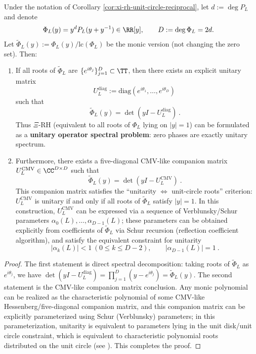 \begin{proposition}\label{prop:xi-hilbert-polya-cmv}
Under the notation of Corollary \ref{cor:xi-rh-unit-circle-reciprocal}, let \(d:=\deg P_L\) and denote
\[
\Phi_L(y)=y^dP_L(y+y^{-1})\in\RR[y],
\qquad
D:=\deg \Phi_L=2d.
\]
Let \(\widetilde\Phi_L(y):=\Phi_L(y)/\mathrm{lc}(\Phi_L)\) be the monic version (not changing the zero set).
Then:
\begin{enumerate}
  \item If all roots of \(\widetilde\Phi_L\) are \(\{e^{i\theta_j}\}_{j=1}^{D}\subset\TT\), then there exists an explicit unitary matrix
  \[
  U_L^{\mathrm{diag}}:=\mathrm{diag}(e^{i\theta_1},\dots,e^{i\theta_D})
  \]
  such that
  \[
  \boxed{\ \widetilde\Phi_L(y)=\det(yI-U_L^{\mathrm{diag}})\ }.
  \]
  Thus \(\Xi\)-RH (equivalent to all roots of \(\Phi_L\) lying on \(|y|=1\)) can be formulated as a \textbf{unitary operator spectral problem}: zero phases are exactly unitary spectrum.
  \item Furthermore, there exists a five-diagonal CMV-like companion matrix \(U_L^{\mathrm{CMV}}\in\CC^{D\times D}\) such that
  \[
  \boxed{\ \widetilde\Phi_L(y)=\det(yI-U_L^{\mathrm{CMV}})\ }.
  \]
  This companion matrix satisfies the ``unitarity \(\Leftrightarrow\) unit-circle roots'' criterion: \(U_L^{\mathrm{CMV}}\) is unitary if and only if all roots of \(\widetilde\Phi_L\) satisfy \(|y|=1\).
  In this construction, \(U_L^{\mathrm{CMV}}\) can be expressed via a sequence of Verblunsky/Schur parameters \(\alpha_0(L),\dots,\alpha_{D-1}(L)\); these parameters can be obtained explicitly from coefficients of \(\widetilde\Phi_L\) via Schur recursion (reflection coefficient algorithm), and satisfy the equivalent constraint for unitarity
  \[
  \boxed{\ |\alpha_k(L)|<1\ (0\le k\le D-2),\qquad |\alpha_{D-1}(L)|=1\ }.
  \]
\end{enumerate}
\end{proposition}
\begin{proof}
The first statement is direct spectral decomposition: taking roots of \(\widetilde\Phi_L\) as \(e^{i\theta_j}\), we have \(\det(yI-U_L^{\mathrm{diag}})=\prod_{j=1}^{D}(y-e^{i\theta_j})=\widetilde\Phi_L(y)\).
The second statement is the CMV-like companion matrix conclusion. Any monic polynomial can be realized as the characteristic polynomial of some CMV-like Hessenberg/five-diagonal companion matrix, and this companion matrix can be explicitly parameterized using Schur (Verblunsky) parameters; in this parameterization, unitarity is equivalent to parameters lying in the unit disk/unit circle constraint, which is equivalent to characteristic polynomial roots distributed on the unit circle (see \cite{CanteroMoralVelazquez2003CMV,Simon2005OPUC1,BevilacquaDelCorsoGemignani2015CMVCompanion}). This completes the proof.
\end{proof}

